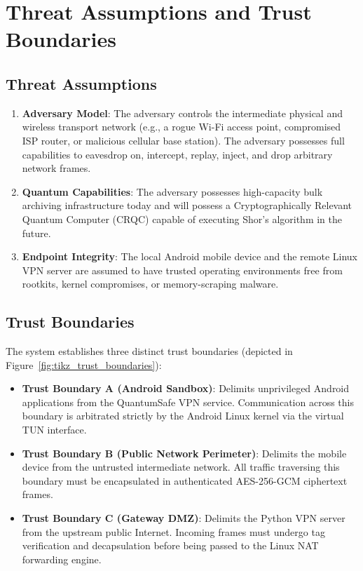 \section{Threat Assumptions and Trust Boundaries}
\label{sec:threat_assumptions_trust_boundaries}

\subsection{Threat Assumptions}
\begin{enumerate}
    \item \textbf{Adversary Model}: The adversary controls the intermediate physical and wireless transport network (e.g., a rogue Wi-Fi access point, compromised ISP router, or malicious cellular base station). The adversary possesses full capabilities to eavesdrop on, intercept, replay, inject, and drop arbitrary network frames.
    \item \textbf{Quantum Capabilities}: The adversary possesses high-capacity bulk archiving infrastructure today and will possess a Cryptographically Relevant Quantum Computer (CRQC) capable of executing Shor's algorithm in the future.
    \item \textbf{Endpoint Integrity}: The local Android mobile device and the remote Linux VPN server are assumed to have trusted operating environments free from rootkits, kernel compromises, or memory-scraping malware.
\end{enumerate}

\subsection{Trust Boundaries}
The system establishes three distinct trust boundaries (depicted in Figure~\ref{fig:tikz_trust_boundaries}):
\begin{itemize}
    \item \textbf{Trust Boundary A (Android Sandbox)}: Delimits unprivileged Android applications from the QuantumSafe VPN service. Communication across this boundary is arbitrated strictly by the Android Linux kernel via the virtual TUN interface.
    \item \textbf{Trust Boundary B (Public Network Perimeter)}: Delimits the mobile device from the untrusted intermediate network. All traffic traversing this boundary must be encapsulated in authenticated AES-256-GCM ciphertext frames.
    \item \textbf{Trust Boundary C (Gateway DMZ)}: Delimits the Python VPN server from the upstream public Internet. Incoming frames must undergo tag verification and decapsulation before being passed to the Linux NAT forwarding engine.
\end{itemize}

